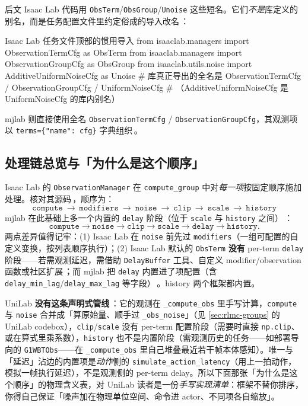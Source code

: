 \begin{note}
后文 Isaac Lab 代码用 \verb|ObsTerm|/\verb|ObsGroup|/\verb|Unoise| 这些短名。它们\emph{不是}库定义的别名，而是任务配置文件里约定俗成的导入改名\,\cite{isaaclab2024}：
\begin{codebox}[Python]{Isaac Lab 任务文件顶部的惯用导入}
from isaaclab.managers import ObservationTermCfg as ObsTerm
from isaaclab.managers import ObservationGroupCfg as ObsGroup
from isaaclab.utils.noise import AdditiveUniformNoiseCfg as Unoise
# 库真正导出的全名是 ObservationTermCfg / ObservationGroupCfg / UniformNoiseCfg
# （AdditiveUniformNoiseCfg 是 UniformNoiseCfg 的库内别名）
\end{codebox}
mjlab 则直接使用全名 \verb|ObservationTermCfg| / \verb|ObservationGroupCfg|，其观测项以 \verb|terms={"name": cfg}| 字典组织\,\cite{mjlab2026}。
\end{note}

\subsection{处理链总览与「为什么是这个顺序」}
\label{sec:rlmc-pipeline-order}

Isaac Lab 的 \verb|ObservationManager| 在 \verb|compute_group| 中对\emph{每一项}按固定顺序施加处理。核对其源码\,\cite{isaaclab2024}，顺序为：
\begin{equation*}
\boxed{\ \texttt{compute}\ \to\ \texttt{modifiers}\ \to\ \texttt{noise}\ \to\ \texttt{clip}\ \to\ \texttt{scale}\ \to\ \texttt{history}\ }
\end{equation*}
mjlab 在此基础上多一个内置的 \verb|delay| 阶段（位于 \verb|scale| 与 \verb|history| 之间）\,\cite{mjlab2026}：
\begin{equation*}
\texttt{compute}\to\texttt{noise}\to\texttt{clip}\to\texttt{scale}\to\texttt{delay}\to\texttt{history}.
\end{equation*}
两点差异值得记牢：(1) Isaac Lab 在 \verb|noise| 前先过 \verb|modifiers|（一组可配置的自定义变换，按列表顺序执行）；(2) Isaac Lab 默认的 \verb|ObsTerm| \textbf{没有} per-term \verb|delay| 阶段——若需观测延迟，需借助 \verb|DelayBuffer| 工具、自定义 modifier/observation 函数或社区扩展\,\cite{isaaclab2024}；而 mjlab 把 \verb|delay| 内置进了项配置（含 \verb|delay_min_lag|/\verb|delay_max_lag| 等字段）\,\cite{mjlab2026}。history 两个框架都内置。

UniLab \textbf{没有这条声明式管线}\,\cite{unilab2026}：它的观测在 \verb|_compute_obs| 里手写计算，\texttt{compute} 与 \texttt{noise} 合并成「算原始量、顺手过 \verb|_obs_noise|」（见 \cref{sec:rlmc-groups} 的 UniLab codebox），\texttt{clip}/\texttt{scale} 没有 per-term 配置阶段（需要时直接 \verb|np.clip|、或在算式里乘系数），\texttt{history} 也不是内置阶段（需观测历史的任务——如部署导向的 \verb|G1WBTObs|——在 \verb|_compute_obs| 里自己堆叠最近若干帧本体感知）。唯一与「延迟」沾边的内置项是\emph{动作}侧的 \verb|simulate_action_latency|（用上一拍动作，模拟一帧执行延迟），不是观测侧的 per-term delay。所以下面那张「为什么是这个顺序」的物理含义表，对 UniLab 读者是一份\emph{手写实现清单}：框架不替你排序，你得自己保证「噪声加在物理单位空间、命令进 actor、不同项各自缩放」。

